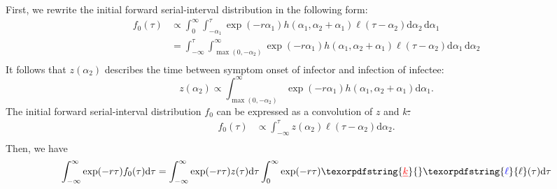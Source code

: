 \documentclass[12pt]{article}
\newcommand{\pinf}{\ensuremath{\alpha_1}} %
\newcommand{\sinf}{\ensuremath{\alpha_2}} %
\newcommand{\idist}{\ell} %
\providecommand{\DIFaddtex}[1]{{\protect\color{blue}\uwave{#1}}} %
\providecommand{\DIFdeltex}[1]{{\protect\color{red}\sout{#1}}}                      %
\providecommand{\DIFaddbegin}{} %
\providecommand{\DIFaddend}{} %
\providecommand{\DIFdelbegin}{} %
\providecommand{\DIFdelend}{} %
\providecommand{\DIFadd}[1]{\texorpdfstring{\DIFaddtex{#1}}{#1}} %
\providecommand{\DIFdel}[1]{\texorpdfstring{\DIFdeltex{#1}}{}} %
\newcommand{\DIFscaledelfig}{0.5}
\newlength{\DIFdelgraphicswidth} %
\newlength{\DIFdelgraphicsheight} %
\newcommand{\DIFaddincludegraphics}[2][]{{\color{blue}\fbox{\DIFOincludegraphics[#1]{#2}}}} %
\newcommand{\DIFdelincludegraphics}[2][]{%
\sbox{\DIFdelgraphicsbox}{\DIFOincludegraphics[#1]{#2}}%
\settoboxwidth{\DIFdelgraphicswidth}{\DIFdelgraphicsbox} %
\settoboxtotalheight{\DIFdelgraphicsheight}{\DIFdelgraphicsbox} %
\scalebox{\DIFscaledelfig}{%
\parbox[b]{\DIFdelgraphicswidth}{\usebox{\DIFdelgraphicsbox}\\[-\baselineskip] \rule{\DIFdelgraphicswidth}{0em}}\llap{\resizebox{\DIFdelgraphicswidth}{\DIFdelgraphicsheight}{%
\setlength{\unitlength}{\DIFdelgraphicswidth}%
\begin{picture}(1,1)%
\thicklines\linethickness{2pt} %
{\color[rgb]{1,0,0}\put(0,0){\framebox(1,1){}}}%
{\color[rgb]{1,0,0}\put(0,0){\line( 1,1){1}}}%
{\color[rgb]{1,0,0}\put(0,1){\line(1,-1){1}}}%
\end{picture}%
}\hspace*{3pt}}} %
} %
\DeclareRobustCommand{\DIFaddbegin}{\DIFOaddbegin \let\includegraphics\DIFaddincludegraphics} %
\DeclareRobustCommand{\DIFaddend}{\DIFOaddend \let\includegraphics\DIFOincludegraphics} %
\DeclareRobustCommand{\DIFdelbegin}{\DIFOdelbegin \let\includegraphics\DIFdelincludegraphics} %
\DeclareRobustCommand{\DIFdelend}{\DIFOaddend \let\includegraphics\DIFOincludegraphics} %
\begin{document}
First, we rewrite the initial forward serial-interval distribution in the following form:
\begin{equation}
\DIFdelbegin %
\DIFdelend \DIFaddbegin \begin{aligned}
f_{0}(\tau) &\propto \int_0^\infty \int_{-\pinf}^{\tau} \exp(-r\pinf) h(\pinf, \sinf + \pinf) \idist(\tau - \sinf) \mathrm{d}\sinf\,\mathrm{d}\pinf\\
&= \int_{-\infty}^{\tau} \int_{\max{(0,-\sinf)}}^{\infty} \exp(-r\pinf) h(\pinf, \sinf + \pinf)\idist(\tau - \sinf)\mathrm{d}\pinf\, \mathrm{d}\sinf\\
\end{aligned}\DIFaddend 
\end{equation}
It follows that $z(\sinf)$ describes the time between symptom onset of infector and infection of infectee:
\begin{equation}
z(\sinf) \propto \int_{\max{(0,-\sinf)}}^{\infty} \exp(-r\pinf) h(\pinf, \sinf + \pinf) \mathrm{d}\pinf.
\end{equation}
The initial forward serial-interval distribution $f_0$ can be expressed as a convolution of $z$ and \DIFdelbegin \DIFdel{$k$:
}\DIFdelend \DIFaddbegin \DIFadd{$\idist$:
}\DIFaddend \begin{equation}
\DIFdelbegin %
\DIFdelend \DIFaddbegin \begin{aligned}
f_{0}(\tau) &\propto \int_{-\infty}^{\tau} z(\sinf) \idist(\tau - \sinf) \mathrm{d}\sinf.\\
\end{aligned}\DIFaddend 
\end{equation}
Then, we have
\begin{equation}
\int_{-\infty}^\infty \exp(-r\tau) f_{0}(\tau) \mathrm{d} \tau = \int_{-\infty}^\infty \exp(-r\tau) z(\tau) \mathrm{d} \tau \int_{0}^\infty \exp(-r\tau) \DIFdelbegin \DIFdel{k}\DIFdelend \DIFaddbegin \DIFadd{\idist}\DIFaddend (\tau) \mathrm{d} \tau
\end{equation}
\end{document}
